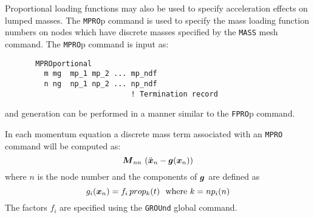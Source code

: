 Proportional loading functions may also be used to specify acceleration
effects on lumped masses.  The {\tt MPRO}p command is used to specify
the mass loading function numbers on nodes which have discrete masses
specified by the {\tt MASS} mesh command.  The {\tt MPRO}p command is
input as:
\begin{verbatim}
       MPROportional
         m mg  mp_1 mp_2 ... mp_ndf
         n ng  np_1 np_2 ... np_ndf
                             ! Termination record
\end{verbatim}
and generation can be performed in a manner similar to the {\tt FPRO}p
command.

In each momentum equation a discrete mass term associated with
an {\tt MPRO} command will be computed as:
\begin{equation}
\boldsymbol{M}_{nn} \, \left( \ddot{\boldsymbol{x}}_n - \boldsymbol{g}(\boldsymbol{x}_n) \right)
\end{equation} 
where $n$ is the node number and the components of $\boldsymbol{g}$ are defined as
\begin{equation}
g_i(\boldsymbol{x}_n) = f_i \, prop_k(t) ~~{\rm where} ~ k = np_i(n)  
\end{equation}
The factors $f_i$ are specified using the {\tt GROUnd} global command.
